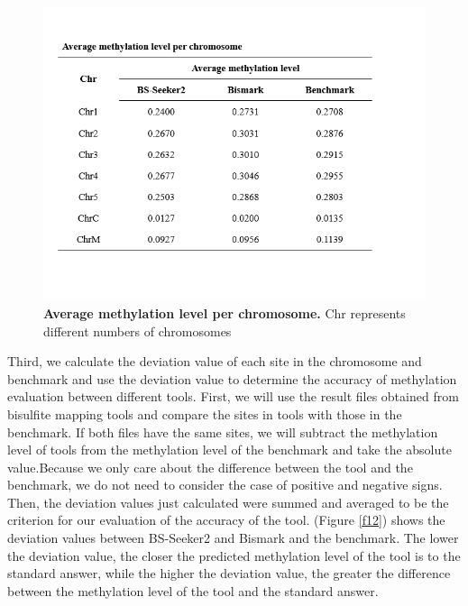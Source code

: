 \documentclass{PHlab-thesis}
\begin{document}
\begin{figure}[h]
  \centering
  \includegraphics[scale=0.8]{table/table4.png}
  \caption{\textbf{Average methylation level per chromosome.}
  Chr represents different numbers of chromosomes}
  \label{f11}
\end{figure}

\par
Third, we calculate the deviation value of each site in the chromosome and benchmark and use the deviation value to determine the accuracy of methylation evaluation between different tools. First, we will use the result files obtained from bisulfite mapping tools and compare the sites in tools with those in the benchmark. If both files have the same sites, we will subtract the methylation level of tools from the methylation level of the benchmark and take the absolute value.Because we only care about the difference between the tool and the benchmark, we do not need to consider the case of positive and negative signs. Then, the deviation values just calculated were summed and averaged to be the criterion for our evaluation of the accuracy of the tool. (Figure \ref{f12}) shows the deviation values between BS-Seeker2 and Bismark and the benchmark. The lower the deviation value, the closer the predicted methylation level of the tool is to the standard answer, while the higher the deviation value, the greater the difference between the methylation level of the tool and the standard answer.
\end{document}
